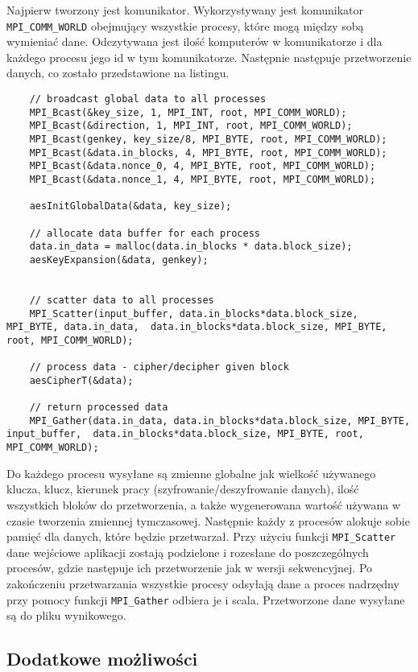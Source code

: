 \documentclass[a4paper,12pt]{article}
\begin{document}
Najpierw tworzony jest komunikator. Wykorzystywany jest komunikator \texttt{MPI\_COMM\_WORLD} obejmujący wszystkie procesy, które mogą między sobą wymieniać dane. Odczytywana jest ilość komputerów w komunikatorze i dla każdego procesu jego id w tym komunikatorze. Następnie następuje przetworzenie danych, co zostało przedstawione na listingu.

\begin{lstlisting}
    // broadcast global data to all processes
    MPI_Bcast(&key_size, 1, MPI_INT, root, MPI_COMM_WORLD);
    MPI_Bcast(&direction, 1, MPI_INT, root, MPI_COMM_WORLD);
    MPI_Bcast(genkey, key_size/8, MPI_BYTE, root, MPI_COMM_WORLD);
    MPI_Bcast(&data.in_blocks, 4, MPI_BYTE, root, MPI_COMM_WORLD);
    MPI_Bcast(&data.nonce_0, 4, MPI_BYTE, root, MPI_COMM_WORLD);
    MPI_Bcast(&data.nonce_1, 4, MPI_BYTE, root, MPI_COMM_WORLD);

	aesInitGlobalData(&data, key_size);

    // allocate data buffer for each process
    data.in_data = malloc(data.in_blocks * data.block_size);
    aesKeyExpansion(&data, genkey);


    // scatter data to all processes
	MPI_Scatter(input_buffer, data.in_blocks*data.block_size, MPI_BYTE, data.in_data,  data.in_blocks*data.block_size, MPI_BYTE, root, MPI_COMM_WORLD);

	// process data - cipher/decipher given block
	aesCipherT(&data);

	// return processed data
	MPI_Gather(data.in_data, data.in_blocks*data.block_size, MPI_BYTE, input_buffer,  data.in_blocks*data.block_size, MPI_BYTE, root, MPI_COMM_WORLD);
\end{lstlisting}

Do każdego procesu wysyłane są zmienne globalne jak wielkość używanego klucza, klucz, kierunek pracy (szyfrowanie/deszyfrowanie danych), ilość wszystkich bloków do przetworzenia, a także wygenerowana wartość używana w czasie tworzenia zmiennej tymczasowej.
Następnie każdy z procesów alokuje sobie pamięć dla danych, które będzie przetwarzał. Przy użyciu funkcji \texttt{MPI\_Scatter} dane wejściowe aplikacji zostają podzielone i rozesłane do poszczególnych procesów, gdzie następuje ich przetworzenie jak w wersji sekwencyjnej. Po zakończeniu przetwarzania wszystkie procesy odsyłają dane a proces nadrzędny przy pomocy funkcji \texttt{MPI\_Gather} odbiera je i scala. Przetworzone dane wysyłane są do pliku wynikowego.


\subsection{Dodatkowe możliwości}
\end{document}
